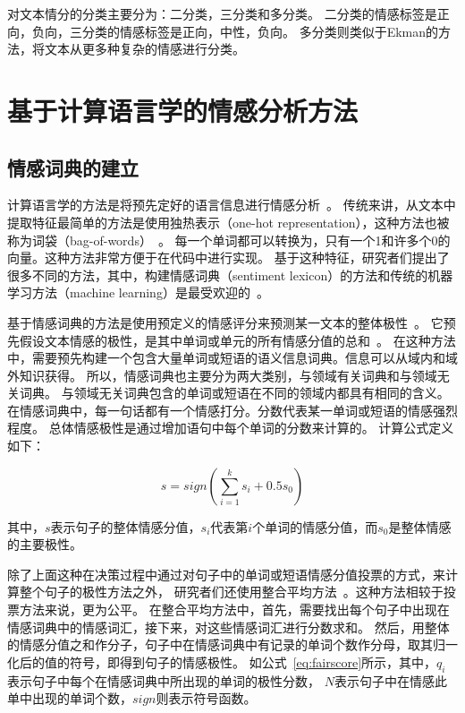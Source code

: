 对文本情分的分类主要分为：二分类，三分类和多分类。
二分类的情感标签是{正向，负向}，三分类的情感标签是{正向，中性，负向}。
多分类则类似于Ekman的方法，将文本从更多种复杂的情感进行分类。

\section{基于计算语言学的情感分析方法}

\subsection{情感词典的建立}
计算语言学的方法是将预先定好的语言信息进行情感分析~。
传统来讲，从文本中提取特征最简单的方法是使用独热表示（one-hot representation），这种方法也被称为词袋（bag-of-words）~。
每一个单词都可以转换为，只有一个1和许多个0的向量。这种方法非常方便于在代码中进行实现。
基于这种特征，研究者们提出了很多不同的方法，其中，构建情感词典（sentiment lexicon）的方法和传统的机器学习方法（machine learning）是最受欢迎的~。

基于情感词典的方法是使用预定义的情感评分来预测某一文本的整体极性~。
它预先假设文本情感的极性，是其中单词或单元的所有情感分值的总和~。
在这种方法中，需要预先构建一个包含大量单词或短语的语义信息词典。信息可以从域内和域外知识获得。
所以，情感词典也主要分为两大类别，与领域有关词典和与领域无关词典。
与领域无关词典包含的单词或短语在不同的领域内都具有相同的含义。
在情感词典中，每一句话都有一个情感打分。分数代表某一单词或短语的情感强烈程度。
总体情感极性是通过增加语句中每个单词的分数来计算的。
计算公式定义如下：

\begin{equation}
    s = sign\left(\sum_{i=1}^{k}s_{i}+0.5s_{0}\right )
\end{equation}

其中，${s}$表示句子的整体情感分值，${s_{i}}$代表第${i}$个单词的情感分值，而${s_{0}}$是整体情感的主要极性。

除了上面这种在决策过程中通过对句子中的单词或短语情感分值投票的方式，来计算整个句子的极性方法之外，
研究者们还使用整合平均方法~。这种方法相较于投票方法来说，更为公平。
在整合平均方法中，首先，需要找出每个句子中出现在情感词典中的情感词汇，接下来，对这些情感词汇进行分数求和。
然后，用整体的情感分值之和作分子，句子中在情感词典中有记录的单词个数作分母，取其归一化后的值的符号，即得到句子的情感极性。
如公式~\ref{eq:fairscore}所示，其中，${q_{i}}$表示句子中每个在情感词典中所出现的单词的极性分数，
${N}$表示句子中在情感此单中出现的单词个数，${sign}$则表示符号函数。

